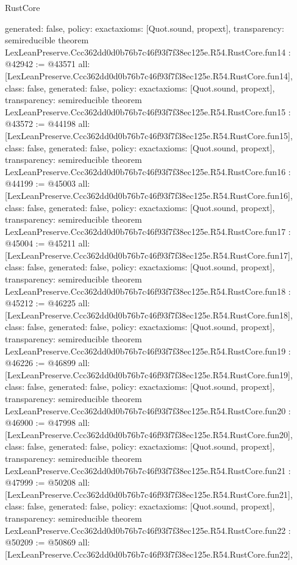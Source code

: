 \begin{lexlean}{RustCore}
\begin{coremodule}
{  generated: false,
  policy: exact{axioms: [Quot.sound, propext]},
  transparency: semireducible
}
theorem LexLeanPreserve.Ccc362dd0d0b76b7c46f93f7f38ec125e.R54.RustCore.fun14 : @42942 := @43571 {
  all: [LexLeanPreserve.Ccc362dd0d0b76b7c46f93f7f38ec125e.R54.RustCore.fun14],
  class: false,
  generated: false,
  policy: exact{axioms: [Quot.sound, propext]},
  transparency: semireducible
}
theorem LexLeanPreserve.Ccc362dd0d0b76b7c46f93f7f38ec125e.R54.RustCore.fun15 : @43572 := @44198 {
  all: [LexLeanPreserve.Ccc362dd0d0b76b7c46f93f7f38ec125e.R54.RustCore.fun15],
  class: false,
  generated: false,
  policy: exact{axioms: [Quot.sound, propext]},
  transparency: semireducible
}
theorem LexLeanPreserve.Ccc362dd0d0b76b7c46f93f7f38ec125e.R54.RustCore.fun16 : @44199 := @45003 {
  all: [LexLeanPreserve.Ccc362dd0d0b76b7c46f93f7f38ec125e.R54.RustCore.fun16],
  class: false,
  generated: false,
  policy: exact{axioms: [Quot.sound, propext]},
  transparency: semireducible
}
theorem LexLeanPreserve.Ccc362dd0d0b76b7c46f93f7f38ec125e.R54.RustCore.fun17 : @45004 := @45211 {
  all: [LexLeanPreserve.Ccc362dd0d0b76b7c46f93f7f38ec125e.R54.RustCore.fun17],
  class: false,
  generated: false,
  policy: exact{axioms: [Quot.sound, propext]},
  transparency: semireducible
}
theorem LexLeanPreserve.Ccc362dd0d0b76b7c46f93f7f38ec125e.R54.RustCore.fun18 : @45212 := @46225 {
  all: [LexLeanPreserve.Ccc362dd0d0b76b7c46f93f7f38ec125e.R54.RustCore.fun18],
  class: false,
  generated: false,
  policy: exact{axioms: [Quot.sound, propext]},
  transparency: semireducible
}
theorem LexLeanPreserve.Ccc362dd0d0b76b7c46f93f7f38ec125e.R54.RustCore.fun19 : @46226 := @46899 {
  all: [LexLeanPreserve.Ccc362dd0d0b76b7c46f93f7f38ec125e.R54.RustCore.fun19],
  class: false,
  generated: false,
  policy: exact{axioms: [Quot.sound, propext]},
  transparency: semireducible
}
theorem LexLeanPreserve.Ccc362dd0d0b76b7c46f93f7f38ec125e.R54.RustCore.fun20 : @46900 := @47998 {
  all: [LexLeanPreserve.Ccc362dd0d0b76b7c46f93f7f38ec125e.R54.RustCore.fun20],
  class: false,
  generated: false,
  policy: exact{axioms: [Quot.sound, propext]},
  transparency: semireducible
}
theorem LexLeanPreserve.Ccc362dd0d0b76b7c46f93f7f38ec125e.R54.RustCore.fun21 : @47999 := @50208 {
  all: [LexLeanPreserve.Ccc362dd0d0b76b7c46f93f7f38ec125e.R54.RustCore.fun21],
  class: false,
  generated: false,
  policy: exact{axioms: [Quot.sound, propext]},
  transparency: semireducible
}
theorem LexLeanPreserve.Ccc362dd0d0b76b7c46f93f7f38ec125e.R54.RustCore.fun22 : @50209 := @50869 {
  all: [LexLeanPreserve.Ccc362dd0d0b76b7c46f93f7f38ec125e.R54.RustCore.fun22],
}
\end{coremodule}
\end{lexlean}
